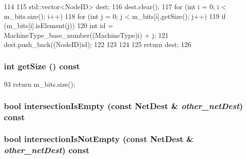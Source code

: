 \begin{DoxyCode}
114 {
115     std::vector<NodeID> dest;
116     dest.clear();
117     for (int i = 0; i < m_bits.size(); i++) {
118         for (int j = 0; j < m_bits[i].getSize(); j++) {
119             if (m_bits[i].isElement(j)) {
120                 int id = MachineType_base_number((MachineType)i) + j;
121                 dest.push_back((NodeID)id);
122             }
123         }
124     }
125     return dest;
126 }
\end{DoxyCode}
\hypertarget{classNetDest_a4f8dbb76319fe40792867d6ca51ef447}{
\subsubsection[{getSize}]{\setlength{\rightskip}{0pt plus 5cm}int getSize () const}}
\label{classNetDest_a4f8dbb76319fe40792867d6ca51ef447}



\begin{DoxyCode}
93 { return m_bits.size(); }
\end{DoxyCode}
\hypertarget{classNetDest_a21c3996c8289a60f84da64a30c5c0857}{
\subsubsection[{intersectionIsEmpty}]{\setlength{\rightskip}{0pt plus 5cm}bool intersectionIsEmpty (const {\bf NetDest} \& {\em other\_\-netDest}) const}}
\label{classNetDest_a21c3996c8289a60f84da64a30c5c0857}
\hypertarget{classNetDest_ac6846c5f0b48a8c8016e72f9e7a87616}{
\subsubsection[{intersectionIsNotEmpty}]{\setlength{\rightskip}{0pt plus 5cm}bool intersectionIsNotEmpty (const {\bf NetDest} \& {\em other\_\-netDest}) const}}
\label{classNetDest_ac6846c5f0b48a8c8016e72f9e7a87616}



